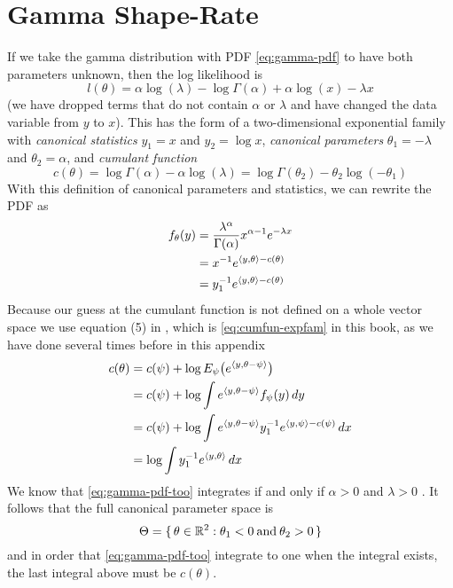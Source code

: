 \section{Gamma Shape-Rate}

If we take the gamma distribution with PDF \eqref{eq:gamma-pdf}
to have both parameters unknown, then the log likelihood is
$$
   l(\theta)
   =
   \alpha \log(\lambda) - \log \Gamma(\alpha) + \alpha \log(x) - \lambda x
$$
(we have dropped terms that do not contain $\alpha$ or $\lambda$ and have
changed the data variable from $y$ to $x$).  This has the form of
a two-dimensional exponential family with \emph{canonical statistics}
$y_1 = x$ and $y_2 = \log x$, \emph{canonical parameters}
$\theta_1 = - \lambda$ and $\theta_2 = \alpha$, and
\emph{cumulant function}
\begin{equation} \label{eq:cumfun-gamma-shape-rate}
   c(\theta) = \log \Gamma(\alpha) - \alpha \log(\lambda)
   = \log \Gamma(\theta_2) - \theta_2 \log(- \theta_1)
\end{equation}
With this definition of canonical parameters and statistics, we can rewrite
the PDF as
\begin{equation} \label{eq:gamma-pdf-too}
\begin{split}
   f_\theta(y)
   & =
   \frac{\lambda^\alpha}{\Gamma(\alpha)} x^{\alpha - 1} e^{- \lambda x}
   \\
   & =
   x^{- 1} e^{\langle y, \theta \rangle - c(\theta)}
   \\
   & =
   y_1^{- 1} e^{\langle y, \theta \rangle - c(\theta)}
\end{split}
\end{equation}
Because our guess at the cumulant function is not defined on a whole vector
space we use equation (5) in \citet{geyer-gdor},
which is \eqref{eq:cumfun-expfam}
in this book, as we have done several times before in this appendix
\begin{align*}
   c(\theta)
   & =
   c(\psi) + \log E_\psi \bigl( e^{\langle y, \theta - \psi \rangle} \bigr)
   \\
   & =
   c(\psi) + \log \int e^{\langle y, \theta - \psi \rangle} f_\psi(y) \, d y
   \\
   & =
   c(\psi) + \log \int e^{\langle y, \theta - \psi \rangle}
   y_1^{- 1} e^{\langle y, \psi \rangle - c(\psi)} \, d x
   \\
   & =
   \log \int y_1^{- 1} e^{\langle y, \theta \rangle} \, d x
\end{align*}
We know that \eqref{eq:gamma-pdf-too} integrates if and only if
$\alpha > 0$ and $\lambda > 0$ \citep[Slides~27--30]{slides-5101-deck-6}.
It follows that the full canonical parameter space is
$$
   \Theta = \{\,  \theta \in \mathbb{R}^2 : \theta_1 < 0 \mathbin{\rm and} \theta_2 > 0  \,\}
$$
and in order that \eqref{eq:gamma-pdf-too} integrate to one when the integral
exists, the last integral above must be $c(\theta)$.

